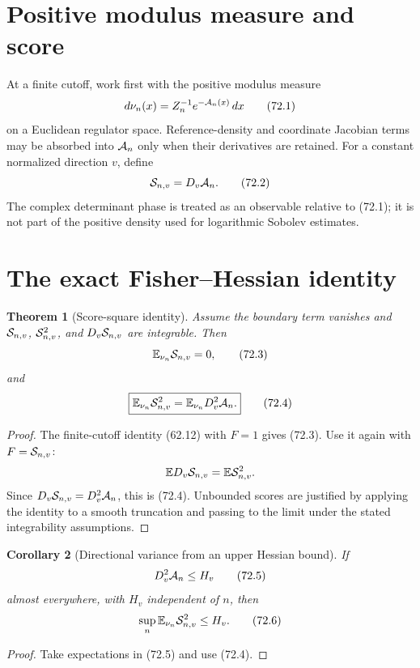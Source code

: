 \documentclass[11pt]{article}
\newtheorem{theorem}{Theorem}[section]
\newtheorem{corollary}[theorem]{Corollary}
\theoremstyle{remark}
\begin{document}
\section{Positive modulus measure and score}

At a finite cutoff, work first with the positive modulus measure
\[
 d\nu_n(x)=Z_n^{-1}e^{-{\cal A}_n(x)}\,dx             \tag{72.1}
\]
on a Euclidean regulator space.  Reference-density and coordinate
Jacobian terms may be absorbed into \({\cal A}_n\) only when their
derivatives are retained.  For a constant normalized direction
\(v\), define
\[
 {\cal S}_{n,v}=D_v{\cal A}_n.                        \tag{72.2}
\]
The complex determinant phase is treated as an observable relative
to (72.1); it is not part of the positive density used for
logarithmic Sobolev estimates.

\section{The exact Fisher--Hessian identity}

\begin{theorem}[Score-square identity]
\label{thm:v15v72-fisher}
Assume the boundary term vanishes and
\({\cal S}_{n,v}\), \({\cal S}_{n,v}^2\), and
\(D_v{\cal S}_{n,v}\) are integrable.  Then
\[
 \mathbb E_{\nu_n}{\cal S}_{n,v}=0,                   \tag{72.3}
\]
and
\[
 \boxed{
 \mathbb E_{\nu_n}{\cal S}_{n,v}^2
 =
 \mathbb E_{\nu_n}D_v^2{\cal A}_n.}                   \tag{72.4}
\]
\end{theorem}

\begin{proof}
The finite-cutoff identity (62.12) with \(F=1\) gives (72.3).
Use it again with \(F={\cal S}_{n,v}\):
\[
 \mathbb E D_v{\cal S}_{n,v}
 =
 \mathbb E{\cal S}_{n,v}^2.
\]
Since \(D_v{\cal S}_{n,v}=D_v^2{\cal A}_n\), this is
(72.4).  Unbounded scores are justified by applying the identity
to a smooth truncation and passing to the limit under the stated
integrability assumptions.
\end{proof}

\begin{corollary}[Directional variance from an upper Hessian bound]
\label{cor:v15v72-variance}
If
\[
 D_v^2{\cal A}_n\leq H_v                              \tag{72.5}
\]
almost everywhere, with \(H_v\) independent of \(n\), then
\[
 \sup_n\mathbb E_{\nu_n}{\cal S}_{n,v}^2\leq H_v.      \tag{72.6}
\]
\end{corollary}

\begin{proof}
Take expectations in (72.5) and use (72.4).
\end{proof}
\end{document}

